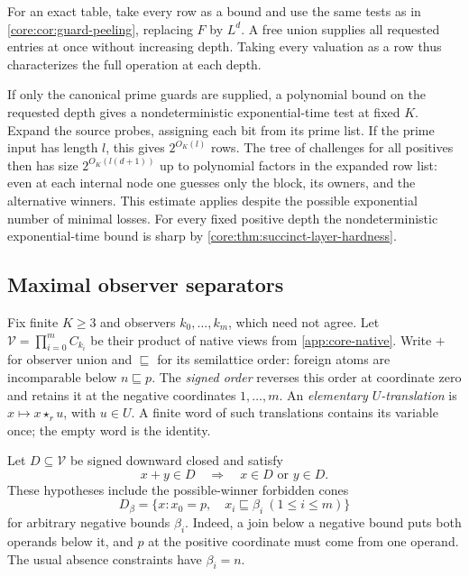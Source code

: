 For an exact table, take every row as a bound and use the same tests
as in \cref{core:cor:guard-peeling}, replacing $F$ by $L^d$. A free
union supplies all requested entries at once without increasing depth.
Taking every valuation as a row thus characterizes the full operation
at each depth.

If only the canonical prime guards are supplied, a polynomial bound
on the requested depth gives a nondeterministic exponential-time
test at fixed $K$. Expand the source probes, assigning each bit
from its prime list. If the prime input has length $l$, this gives
$2^{O_K(l)}$ rows. The tree of challenges for all positives then
has size $2^{O_K(l(d+1))}$ up to polynomial factors in the expanded
row list: even at each internal node one guesses only the block, its
owners, and the alternative winners. This estimate applies despite
the possible exponential number of minimal losses. For every fixed positive
depth the nondeterministic exponential-time bound is sharp by
\cref{core:thm:succinct-layer-hardness}.



\subsection{Maximal observer separators}
\label{app:core-maximal-separation}

Fix finite $K\geq3$ and observers $k_0,\ldots,k_m$, which need not agree.
Let $\mathcal V=\prod_{i=0}^m C_{k_i}$ be their product of native views
from \cref{app:core-native}. Write $+$ for observer union and
$\sqsubseteq$ for its semilattice order: foreign atoms are incomparable
below $n\sqsubseteq p$. The \emph{signed order} reverses this order at
coordinate zero and retains it at the negative coordinates $1,\ldots,m$.
An \emph{elementary $U$-translation} is $x\mapsto x\star_r u$, with
$u\in U$. A finite word of such translations contains its variable once;
the empty word is the identity.

Let $D\subseteq\mathcal V$ be signed downward closed and satisfy
\[
 x+y\in D\quad\Longrightarrow\quad x\in D\text{ or }y\in D.
\]
These hypotheses include the possible-winner forbidden cones
\[
 D_\beta=\{x:x_0=p,\quad x_i\sqsubseteq\beta_i\ (1\leq i\leq m)\}
\]
for arbitrary negative bounds $\beta_i$. Indeed, a join below a negative
bound puts both operands below it, and $p$ at the positive coordinate
must come from one operand. The usual absence constraints have
$\beta_i=n$.

